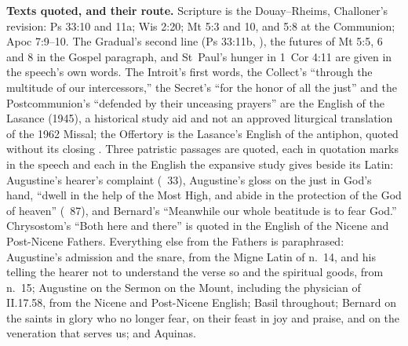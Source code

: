 {\textbf{Texts quoted, and their route.} Scripture is the Douay--Rheims,
Challoner's revision: Ps 33:10 and 11a; Wis 2:20; Mt 5:3 and 10, and 5:8 at
the Communion; Apoc 7:9--10. The Gradual's second line (Ps 33:11b,
), the futures of Mt 5:5, 6 and 8 in the
Gospel paragraph, and St~Paul's hunger in 1~Cor 4:11 are given in the
speech's own words. The Introit's first words, the Collect's ``through the
multitude of our intercessors,'' the Secret's ``for the honor of all the
just'' and the Postcommunion's ``defended by their unceasing prayers'' are
the English of the Lasance  (1945), a historical study
aid and not an approved liturgical translation of the 1962 Missal; the
Offertory is the Lasance's English of the antiphon, quoted without its
closing . Three patristic passages are quoted, each in
quotation marks in the speech and each in the English the expansive study
gives beside its Latin: Augustine's hearer's complaint (\ 33), Augustine's gloss on the just in God's hand, ``dwell in the help
of the Most High, and abide in the protection of the God of heaven''
(\ 87), and Bernard's ``Meanwhile our whole beatitude
is to fear God.'' Chrysostom's ``Both here and there'' is quoted in the
English of the Nicene and Post-Nicene Fathers. Everything else from the
Fathers is paraphrased: Augustine's admission and the snare, from the Migne
Latin of n.~14, and his telling the hearer not to understand the verse so and
the spiritual goods, from n.~15; Augustine on the Sermon on the Mount,
including the physician of II.17.58, from the Nicene and Post-Nicene English;
Basil throughout; Bernard on the saints in glory who no longer fear, on their
feast in joy and praise, and on the veneration that serves us; and Aquinas.

}
